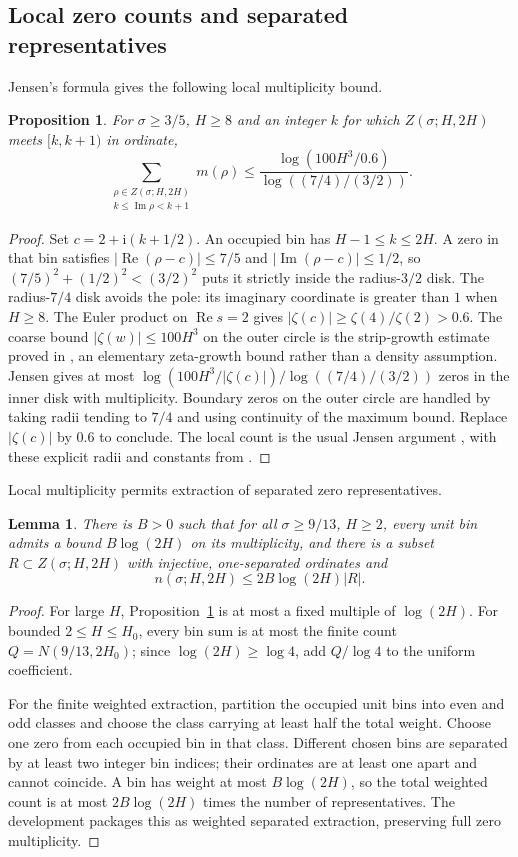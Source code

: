 \documentclass[11pt,a4paper,oneside]{article}
\newtheorem{lemma}[theorem]{Lemma}
\newtheorem{proposition}[theorem]{Proposition}
\theoremstyle{definition}
\newcommand{\ii}{\mathrm i}
\newcommand{\Rea}{\operatorname{Re}}
\newcommand{\Ima}{\operatorname{Im}}
\numberwithin{equation}{section}
\begin{document}
\subsection{Local zero counts and separated representatives}
Jensen's formula gives the following local multiplicity bound.
\begin{proposition}\label{input:jensen}
For $\sigma\ge3/5$, $H\ge8$ and an integer $k$ for which $Z(\sigma;H,2H)$ meets $[k,k+1)$ in ordinate,
\[
 \sum_{\substack{\rho\in Z(\sigma;H,2H)\\k\le\Ima\rho<k+1}}m(\rho)
 \le\frac{\log(100H^3/0.6)}{\log((7/4)/(3/2))}.
\]
\end{proposition}
\begin{proof}
Set $c=2+\ii(k+1/2)$. An occupied bin has $H-1\le k\le2H$. A zero in that bin satisfies $|\Rea(\rho-c)|\le7/5$ and $|\Ima(\rho-c)|\le1/2$, so $(7/5)^2+(1/2)^2<(3/2)^2$ puts it strictly inside the radius-$3/2$ disk. The radius-$7/4$ disk avoids the pole: its imaginary coordinate is greater than $1$ when $H\ge8$. The Euler product on $\Rea s=2$ gives $|\zeta(c)|\ge\zeta(4)/\zeta(2)>0.6$. The coarse bound $|\zeta(w)|\le100H^3$ on the outer circle is the strip-growth estimate proved in \cite{Lewko}, an elementary zeta-growth bound rather than a density assumption. Jensen gives at most $\log(100H^3/|\zeta(c)|)/\log((7/4)/(3/2))$ zeros in the inner disk with multiplicity. Boundary zeros on the outer circle are handled by taking radii tending to $7/4$ and using continuity of the maximum bound. Replace $|\zeta(c)|$ by $0.6$ to conclude. The local count is the usual Jensen argument \cite[Chapter~5]{IwaniecKowalski}, with these explicit radii and constants from \cite{Lewko}.
\end{proof}
Local multiplicity permits extraction of separated zero representatives.
\begin{lemma}\label{lem:representatives}
There is $B>0$ such that for all $\sigma\ge9/13$, $H\ge2$, every unit
bin admits a bound $B\log(2H)$ on its multiplicity, and there is a subset $R\subset Z(\sigma;H,2H)$ with injective,
one-separated ordinates and
\[
 n(\sigma;H,2H)\le2B\log(2H)|R|.
\]
\end{lemma}
\begin{proof}
For large $H$, Proposition~\ref{input:jensen} is at most a fixed multiple of
$\log(2H)$. For bounded $2\le H\le H_0$, every bin sum is at most the
finite count $Q=N(9/13,2H_0)$; since $\log(2H)\ge\log4$, add
$Q/\log4$ to the uniform coefficient.

For the finite weighted extraction, partition the occupied unit bins into
even and odd classes and choose the class carrying at least half the total
weight. Choose one zero from each occupied bin in that class. Different
chosen bins are separated by at least two integer bin indices; their
ordinates are at least one apart and cannot coincide. A bin has weight at
most $B\log(2H)$, so the total weighted count is at most
$2B\log(2H)$ times the number of representatives. The development packages this
as weighted separated extraction, preserving full zero multiplicity.
\end{proof}
\end{document}
